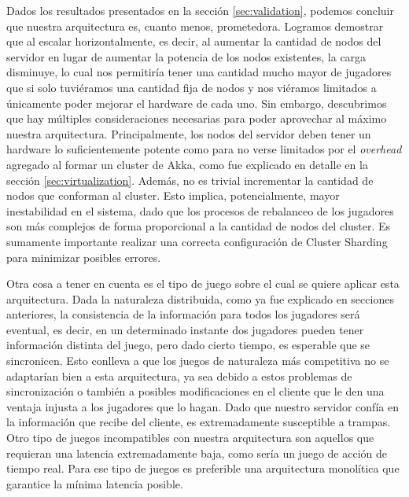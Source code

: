 
\noindent Dados los resultados presentados en la sección \ref{sec:validation}, podemos concluir que nuestra arquitectura es, cuanto menos, prometedora. Logramos demostrar que al escalar horizontalmente,
es decir, al aumentar la cantidad de nodos del servidor en lugar de aumentar la potencia de los nodos existentes,
la carga disminuye, lo cual nos permitiría tener una cantidad mucho mayor de jugadores que si solo tuviéramos
una cantidad fija de nodos y nos viéramos limitados a únicamente poder mejorar el hardware de cada uno.
Sin embargo, descubrimos que hay múltiples consideraciones necesarias para poder aprovechar al máximo nuestra arquitectura. Principalmente, los nodos
del servidor deben tener un hardware lo suficientemente potente como para no verse limitados por el \textit{overhead} agregado al formar un cluster de Akka, como fue explicado en detalle en la sección \ref{sec:virtualization}.
Además, no es trivial incrementar la cantidad de nodos que conforman al cluster. Esto implica, potencialmente, mayor inestabilidad en el sistema, dado que los procesos de rebalanceo
de los jugadores son más complejos de forma proporcional a la cantidad de nodos del cluster. Es sumamente importante realizar una correcta configuración de Cluster Sharding para minimizar posibles errores.

Otra cosa a tener en cuenta es el tipo de juego sobre el cual se quiere aplicar esta arquitectura. Dada la naturaleza
distribuida, como ya fue explicado en secciones anteriores, la consistencia de la información para todos los jugadores
será eventual, es decir, en un determinado instante dos jugadores pueden tener información distinta del juego, pero dado cierto tiempo,
es esperable que se sincronicen. Esto conlleva a que los juegos de naturaleza más competitiva no se adaptarían bien a esta
arquitectura, ya sea debido a estos problemas de sincronización o también a posibles modificaciones en el cliente que le den una ventaja
injusta a los jugadores que lo hagan. Dado que nuestro servidor confía en la información que recibe del cliente, es extremadamente susceptible a trampas.
Otro tipo de juegos incompatibles con nuestra arquitectura son aquellos que requieran una latencia extremadamente baja, como sería
un juego de acción de tiempo real. Para ese tipo de juegos es preferible una arquitectura monolítica que garantice la mínima latencia posible.

